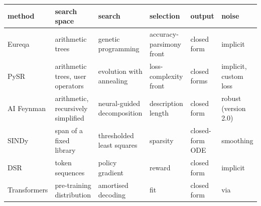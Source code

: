 \documentclass[
]{article}
\begin{document}
\begin{longtable}[]{@{}
  >{\raggedright\arraybackslash}p{}
  >{\raggedright\arraybackslash}p{}
  >{\raggedright\arraybackslash}p{}
  >{\raggedright\arraybackslash}p{}
  >{\raggedright\arraybackslash}p{}
  >{\raggedright\arraybackslash}p{}@{}}
\toprule\noalign{}
\begin{minipage}[b]{\linewidth}\raggedright
method
\end{minipage} & \begin{minipage}[b]{\linewidth}\raggedright
search space
\end{minipage} & \begin{minipage}[b]{\linewidth}\raggedright
search
\end{minipage} & \begin{minipage}[b]{\linewidth}\raggedright
selection
\end{minipage} & \begin{minipage}[b]{\linewidth}\raggedright
output
\end{minipage} & \begin{minipage}[b]{\linewidth}\raggedright
noise
\end{minipage} \\
\midrule\noalign{}
\endhead
\bottomrule\noalign{}
\endlastfoot
Eureqa \autocite{schmidt2009distilling} & arithmetic trees & genetic
programming & accuracy-parsimony front & closed form & implicit \\
PySR \autocite{cranmer2023pysr} & arithmetic trees, user operators &
evolution with annealing & loss-complexity front & closed forms &
implicit, custom loss \\
AI Feynman \autocite{udrescu2020aifeynman,udrescu2020aifeynman2} &
arithmetic, recursively simplified & neural-guided decomposition &
description length & closed form & robust (version 2.0) \\
SINDy \autocite{brunton2016sindy} & span of a fixed library &
thresholded least squares & sparsity & closed-form ODE & smoothing \\
DSR \autocite{petersen2021dsr} & token sequences & policy gradient &
reward & closed form & implicit \\
Transformers \autocite{kamienny2022e2e,biggio2021nesymres} &
pre-training distribution & amortised decoding & fit & closed form & via

\end{longtable}
\end{document}
